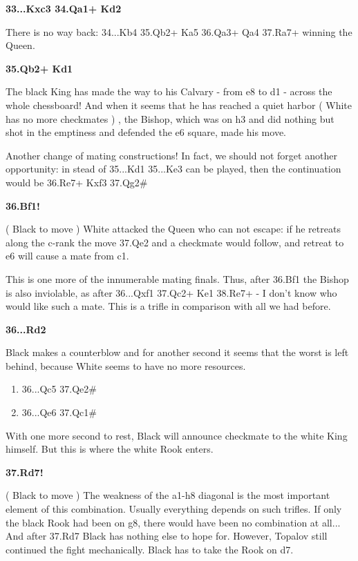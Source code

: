 \documentclass[
	11pt,twocolumn]{article}
\renewcommand{\bf}{\bfseries}
\begin{document}
{\bf 33...Kxc3 34.Qa1+ Kd2 }

There is no way back: 34...Kb4 35.Qb2+ Ka5 36.Qa3+ Qa4 37.Ra7+ winning the Queen. 

{\bf 35.Qb2+ Kd1 }

The black King has made the way to his Calvary - from e8 to d1 - across the whole chessboard! And when it seems that he has reached a quiet harbor ( White has no more checkmates ) , the Bishop, which was on h3 and did nothing but shot in the emptiness and defended the e6 square, made his move.



Another change of mating constructions! In fact, we should not forget another opportunity: in stead of 35...Kd1 35...Ke3  can be played, then the continuation would be 36.Re7+ Kxf3 37.Qg2\#

{\bf 36.Bf1! }

( Black to move ) White attacked the Queen who can not escape: if he retreats along the c-rank the move 37.Qe2 and a checkmate would follow, and retreat to e6 will cause a mate from c1.



This is one more of the innumerable mating finals. Thus, after 36.Bf1  the Bishop is also inviolable, as after 36...Qxf1 37.Qc2+ Ke1 38.Re7+ - I don't know who would like such a mate. This is a trifle in comparison with all we had before. 

{\bf 36...Rd2 }

Black makes a counterblow and for another second it seems that the worst is left behind, because White seems to have no more resources.



\begin{enumerate}
\item
36...Qc5 37.Qe2\#

\item
36...Qe6 37.Qc1\#
\end{enumerate}



With one more second to rest, Black will announce checkmate to the white King himself. But this is where the white Rook enters.

{\bf 37.Rd7! }

( Black to move ) The weakness of the a1-h8 diagonal is the most important element of this combination. Usually everything depends on such trifles. If only the black Rook had been on g8, there would have been no combination at all... And after 37.Rd7 Black has nothing else to hope for. However, Topalov still continued the fight mechanically. Black has to take the Rook on d7.
\end{document}
